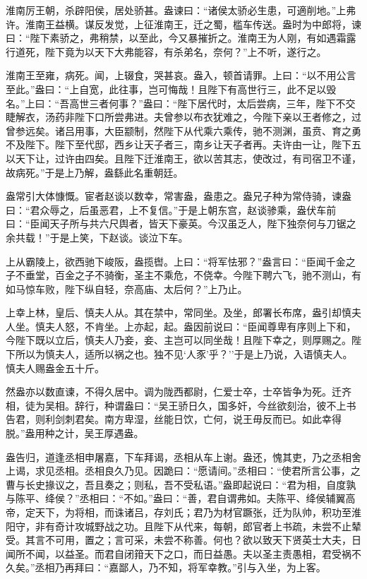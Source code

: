 \documentclass[]{article}
\begin{document}
淮南厉王朝，杀辟阳侯，居处骄甚。盎谏曰：``诸侯太骄必生患，可適削地。''上弗许。淮南王益横。谋反发觉，上征淮南王，迁之蜀，槛车传送。盎时为中郎将，谏曰：``陛下素骄之，弗稍禁，以至此，今又暴摧折之。淮南王为人刚，有如遇霜露行道死，陛下竟为以天下大弗能容，有杀弟名，奈何？''上不听，遂行之。

淮南王至雍，病死。闻，上辍食，哭甚哀。盎入，顿首请罪。上曰：``以不用公言至此。''盎曰：``上自宽，此往事，岂可悔哉！且陛下有高世行三，此不足以毁名。''上曰：``吾高世三者何事？''盎曰：``陛下居代时，太后尝病，三年，陛下不交睫解衣，汤药非陛下口所尝弗进。夫曾参以布衣犹难之，今陛下亲以王者修之，过曾参远矣。诸吕用事，大臣颛制，然陛下从代乘六乘传，驰不测渊，虽贲、育之勇不及陛下。陛下至代邸，西乡让天子者三，南乡让天子者再。夫许由一让，陛下五以天下让，过许由四矣。且陛下迁淮南王，欲以苦其志，使改过，有司宿卫不谨，故病死。''于是上乃解，盎繇此名重朝廷。

盎常引大体慷慨。宦者赵谈以数幸，常害盎，盎患之。盎兄子种为常侍骑，谏盎曰：``君众辱之，后虽恶君，上不复信。''于是上朝东宫，赵谈骖乘，盎伏车前曰：``臣闻天子所与共六尺舆者，皆天下豪英。今汉虽乏人，陛下独奈何与刀锯之余共载！''于是上笑，下赵谈。谈泣下车。

上从霸陵上，欲西驰下峻阪，盎揽辔。上曰：``将军怯邪？''盎言曰：``臣闻千金之子不垂堂，百金之子不骑衡，圣主不乘危，不侥幸。今陛下聘六飞，驰不测山，有如马惊车败，陛下纵自轻，奈高庙、太后何？''上乃止。

上幸上林，皇后、慎夫人从。其在禁中，常同坐。及坐，郎署长布席，盎引却慎夫人坐。慎夫人怒，不肯坐。上亦起，起。盎因前说曰：``臣闻尊卑有序则上下和，今陛下既以立后，慎夫人乃妾，妾、主岂可以同坐哉！且陛下幸之，则厚赐之。陛下所以为慎夫人，适所以祸之也。独不见`人豕'乎？''于是上乃说，入语慎夫人。慎夫人赐盎金五十斤。

然盎亦以数直谏，不得久居中。调为陇西都尉，仁爱士卒，士卒皆争为死。迁齐相，徒为吴相。辞行，种谓盎曰：``吴王骄日久，国多奸，今丝欲刻治，彼不上书告君，则利剑刺君矣。南方卑湿，丝能日饮，亡何，说王毋反而已。如此幸得脱。''盎用种之计，吴王厚遇盎。

盎告归，道逢丞相申屠嘉，下车拜谒，丞相从车上谢。盎还，愧其吏，乃之丞相舍上谒，求见丞相。丞相良久乃见。因跪曰：``愿请间。''丞相曰：``使君所言公事，之曹与长史掾议之，吾且奏之；则私，吾不受私语。''盎即起说曰：``君为相，自度孰与陈平、绛侯？''丞相曰：``不如。''盎曰：``善，君自谓弗如。夫陈平、绛侯辅翼高帝，定天下，为将相，而诛诸吕，存刘氏；君乃为材官蹶张，迁为队帅，积功至淮阳守，非有奇计攻城野战之功。且陛下从代来，每朝，郎官者上书疏，未尝不止辇受。其言不可用，置之；言可采，未尝不称善。何也？欲以致天下贤英士大夫，日闻所不闻，以益圣。而君自闭箝天下之口，而日益愚。夫以圣主责愚相，君受祸不久矣。''丞相乃再拜曰：``嘉鄙人，乃不知，将军幸教。''引与入坐，为上客。
\end{document}
